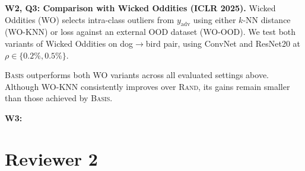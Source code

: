 \noindent\textbf{W2, Q3: Comparison with Wicked Oddities (ICLR 2025).}
Wicked Oddities (\textsc{WO}) selects intra-class outliers from $y_{\text{adv}}$ using either $k$-NN distance (\textsc{WO-KNN}) or loss against an external OOD dataset (\textsc{WO-OOD}). We test both variants of Wicked Oddities on dog$\rightarrow$bird pair, using ConvNet and ResNet20 at $\rho\in\{0.2\%,0.5\%\}$. 
\begin{table}[h!]
\centering
\label{tab:reb-wo}
\vspace{-0.6em}
\setlength{\tabcolsep}{4.5pt}
\renewcommand{\arraystretch}{1.05}
\end{table}

\textsc{Basis} outperforms both \textsc{WO} variants across all evaluated settings above. Although \textsc{WO-KNN} consistently improves over \textsc{Rand}, its gains remain smaller than those achieved by \textsc{Basis}.



\noindent\textbf{W3:}

\clearpage 


\section*{\Large{Reviewer 2}}


